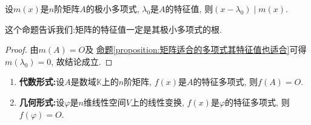 \documentclass[lang=cn,newtx,10pt,scheme=chinese]{elegantbook}
\begin{document}
\begin{proposition}\label{proposition:矩阵的特征值一定是其极小多项式的根}
设$m(x)$是$n$阶矩阵$A$的极小多项式, $\lambda_0$是$A$的特征值, 则$(x - \lambda_0) \mid m(x)$.
\end{proposition}
\begin{note}
这个命题告诉我们:矩阵的特征值一定是其极小多项式的根.
\end{note}
\begin{proof}
由$m(A) = O$及
\hyperref[proposition:矩阵适合的多项式其特征值也适合]{命题\ref{proposition:矩阵适合的多项式其特征值也适合}}可得$m(\lambda_0) = 0$, 故结论成立.
\end{proof}

\begin{theorem}\label{theorem:Cayley-Hamilton定理}
\begin{enumerate}
\item \textbf{代数形式:}设$A$是数域$\mathbb{K}$上的$n$阶矩阵, $f(x)$是$A$的特征多项式, 则$f(A) = O$.

\item \textbf{几何形式:}设$\varphi$是$n$维线性空间$V$上的线性变换, $f(x)$是$\varphi$的特征多项式, 则$f(\varphi) = O$.
\end{enumerate}
\end{theorem}
\end{document}
